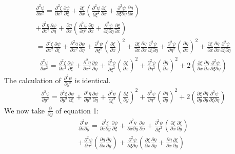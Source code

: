 \documentclass[a4paper,10pt]{article}
\numberwithin{equation}{section}
\begin{document}
\begin{gather*}
\frac{\partial ^2 \psi}{\partial x^2} = \frac{\partial ^2 \xi}{\partial x^2}\frac{\partial \psi}{\partial \xi}
+\frac{\partial \xi}{\partial x}(\frac{\partial ^2 \psi}{\partial \xi^2}\frac{\partial \xi}{\partial x}+
\frac{\partial ^2 \psi}{\partial \xi \partial \eta}\frac{\partial \eta}{\partial x})\\
+\frac{\partial ^2 \eta}{\partial x^2}\frac{\partial \psi}{\partial \eta}
+\frac{\partial \eta}{\partial x}(\frac{\partial ^2 \psi}{\partial \eta^2}\frac{\partial \eta}{\partial x}+
\frac{\partial ^2 \psi}{\partial \xi \partial \eta}\frac{\partial \xi}{\partial x})\\
=\frac{\partial ^2 \xi}{\partial x^2}\frac{\partial \psi}{\partial \xi}+\frac{\partial ^2 \eta}{\partial x^2}\frac{\partial \psi}{\partial \eta}
+\frac{\partial ^2 \psi}{\partial \xi ^2}(\frac{\partial \xi}{\partial x})^2 +\frac{\partial \xi}{\partial x}\frac{\partial \eta}{\partial x}
\frac{\partial ^2 \psi}{\partial \xi \partial \eta}+\frac{\partial ^2 \psi}{\partial \eta ^2}(\frac{\partial \eta}{\partial x})^2
+\frac{\partial \xi}{\partial x}\frac{\partial \eta}{\partial x}\frac{\partial ^2 \psi}{\partial \xi \partial \eta}
\end{gather*}
\begin{gather}
\frac{\partial ^2 \psi}{\partial x^2}=\frac{\partial ^2 \xi}{\partial x^2}\frac{\partial \psi}{\partial \xi}+\frac{\partial ^2 \eta}{\partial x^2}
\frac{\partial \psi}{\partial \eta}
+\frac{\partial ^2 \psi}{\partial \xi ^2}(\frac{\partial \xi}{\partial x})^2+\frac{\partial ^2 \psi}{\partial \eta ^2}(\frac{\partial \eta}{\partial x})^2
+2(\frac{\partial \xi}{\partial x}\frac{\partial \eta}{\partial x}\frac{\partial ^2 \psi}{\partial \xi \partial \eta})
\end{gather}
The calculation of $\frac{\partial ^2 \psi }{\partial y^2}$ is identical.
\begin{gather}
\frac{\partial ^2 \psi}{\partial y^2}=\frac{\partial ^2 \xi}{\partial y^2}\frac{\partial \psi}{\partial \xi}+\frac{\partial ^2 \eta}{\partial y^2}\frac{\partial \psi}{\partial \eta}
+\frac{\partial ^2 \psi}{\partial \xi ^2}(\frac{\partial \xi}{\partial y})^2+\frac{\partial ^2 \psi}{\partial \eta ^2}(\frac{\partial \eta}{\partial y})^2
+2(\frac{\partial \xi}{\partial y}\frac{\partial \eta}{\partial y}\frac{\partial ^2 \psi}{\partial \xi \partial \eta})
\end{gather}
We now take $\frac{\partial}{\partial y}$ of equation 1:
\begin{multline}
 \frac{\partial ^2\psi}{\partial x \partial y}=\frac{\partial ^2\xi}{\partial x \partial y}\frac{\partial \psi}{\partial \xi}
 +\frac{\partial ^2 \eta}{\partial x \partial y}\frac{\partial \psi}{\partial \eta}
 +\frac{\partial^2 \psi}{\partial \xi ^2}(\frac{\partial \xi}{\partial x}\frac{\partial \xi}{\partial y})\\
 +\frac{\partial^2 \psi}{\partial \eta ^2}(\frac{\partial \eta}{\partial x}\frac{\partial \eta}{\partial y})
 +\frac{\partial ^2 \psi}{\partial \xi \partial \eta}(\frac{\partial \xi}{\partial x}\frac{\partial \eta}{\partial y}+\frac{\partial \eta}{\partial x}\frac{\partial \xi}{\partial y} ) 
\end{multline}
\end{document}
